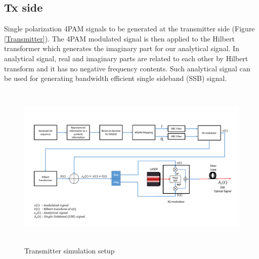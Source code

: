 \subsection{Tx side}
Single polarization 4PAM signals to be generated at the transmitter side (Figure \ref{Transmitter}). The 4PAM modulated signal is then applied to the Hilbert transformer which generates the imaginary part for our analytical signal. In analytical signal, real and imaginary parts are related to each other by Hilbert transform and it has no negative frequency contents. Such analytical signal can be used for generating bandwidth efficient single sideband (SSB) signal.  
\begin{figure}[h]
	\centering
	\includegraphics[width=1.0\textwidth, height=8cm]{./sdf/simplified_coherent_receiver/figures/Simulation_setup_Tx.pdf}
	\caption{Transmitter simulation setup}\label{Simulation_setup_Tx}
\end{figure}

